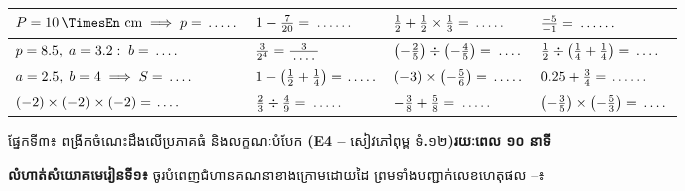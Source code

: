 \documentclass[a4paper,10pt]{article}
\newcommand{\en}[1]{{\TimesEn #1}}
\newcommand{\enbf}[1]{{\TimesEn\bfseries #1}}
\newcommand{\unit}[1]{\,\text{\en{#1}}}
\newcommand{\cnum}[1]{\mbox{\fontsize{10pt}{12pt}\selectfont\ding{\numexpr181+#1\relax}}}
\newcommand{\blank}[1][1.5cm]{\makebox[#1]{\dotfill}}
\newcommand{\secbar}[2]{%
  \begin{tcolorbox}[enhanced, sharp corners, colback=headgray, colframe=black, boxrule=0.9pt, boxsep=1pt, top=2pt, bottom=2pt, left=5pt, right=5pt, before skip=4pt, after skip=3pt]
    {\muol\fontsize{9.2pt}{13pt}\selectfont #1}\hfill{\fontsize{8pt}{11pt}\selectfont\textbf{#2}}
  \end{tcolorbox}%
}
\begin{document}
\vspace{3pt}
{\renewcommand{\arraystretch}{1.68}
\begin{tabular}{|C{4.40cm}|C{4.40cm}|C{4.40cm}|C{4.40cm}|}
  \hline
  \rule[-9pt]{0pt}{24pt}$P=10\unit{cm} \implies p=\blank[0.85cm]$ & $1 - \frac{7}{20} = \blank[1.05cm]$ & $\frac{1}{2}+\frac{1}{2}\times\frac{1}{3} = \blank[0.85cm]$ & $\frac{-5}{-1} = \blank[1.05cm]$ \\
  \hline
  \rule[-9pt]{0pt}{24pt}$p=8.5,\; a=3.2:\; b=\blank[0.70cm]$ & $\frac{3}{2^4} = \frac{3}{\blank[0.70cm]}$ & $\left(-\frac{2}{5}\right)\div\left(-\frac{4}{5}\right) = \blank[0.75cm]$ & $\frac{1}{2}\div\left(\frac{1}{4}+\frac{1}{4}\right) = \blank[0.70cm]$ \\
  \hline
  \rule[-9pt]{0pt}{24pt}$a=2.5,\; b=4 \implies S=\blank[0.70cm]$ & $1 - \left(\frac{1}{2}+\frac{1}{4}\right) = \blank[0.80cm]$ & $(-3)\times\left(-\frac{5}{6}\right) = \blank[0.85cm]$ & $0.25 + \frac{3}{4} = \blank[0.95cm]$ \\
  \hline
  \rule[-9pt]{0pt}{24pt}$(-2)\times(-2)\times(-2)=\blank[0.65cm]$ & $\frac{2}{3}\div\frac{4}{9} = \blank[0.90cm]$ & $-\frac{3}{8} + \frac{5}{8} = \blank[0.90cm]$ & $\left(-\frac{3}{5}\right)\times\left(-\frac{5}{3}\right) = \blank[0.70cm]$ \\
  \hline
\end{tabular}}

\newpage

\secbar{ផ្នែកទី៣៖ ពង្រីកចំណេះដឹងលើប្រភាគធំ និងលក្ខណៈបំបែក \enbf{(E4 --} សៀវភៅពុម្ព ទំ\enbf{.}១២\enbf{)}}{រយៈពេល ១០ នាទី}

\textbf{លំហាត់សំយោគមេរៀនទី១៖} ចូរបំពេញជំហានគណនាខាងក្រោមដោយដៃ ព្រមទាំងបញ្ជាក់លេខហេតុផល \cnum{1}--\cnum{5}៖
\end{document}
